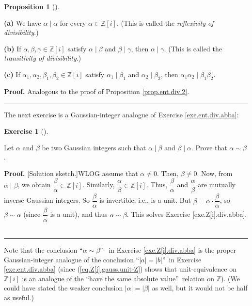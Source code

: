 \documentclass[numbers=enddot,12pt,final,onecolumn,notitlepage]{scrartcl}%
\newcounter{exer}
\numberwithin{exer}{subsection}
\theoremstyle{definition}
\newtheorem{prop}[theo]{Proposition}
\newenvironment{proposition}[1][]
{\begin{prop}[#1]\begin{leftbar}}
{\end{leftbar}\end{prop}}
\newtheorem{exmp}[exer]{Exercise}
\newenvironment{exercise}[1][]
{\begin{exmp}[#1]\begin{leftbar}}
{\end{leftbar}\end{exmp}}
\newenvironment{proof}[1][Proof]{\noindent\textbf{#1.} }{\ \rule{0.5em}{0.5em}}
\begin{document}
\begin{proposition}
\label{prop.Z[i].div.2}\textbf{(a)} We have $\alpha\mid\alpha$ for every
$\alpha\in\mathbb{Z}\left[  i\right]  $. (This is called the
\textit{reflexivity of divisibility}.)

\textbf{(b)} If $\alpha,\beta,\gamma\in\mathbb{Z}\left[  i\right]  $ satisfy
$\alpha\mid\beta$ and $\beta\mid\gamma$, then $\alpha\mid\gamma$. (This is
called the \textit{transitivity of divisibility}.)

\textbf{(c)} If $\alpha_{1},\alpha_{2},\beta_{1},\beta_{2}\in\mathbb{Z}\left[
i\right]  $ satisfy $\alpha_{1}\mid\beta_{1}$ and $\alpha_{2}\mid\beta_{2}$,
then $\alpha_{1}\alpha_{2}\mid\beta_{1}\beta_{2}$.
\end{proposition}

\begin{proof}
Analogous to the proof of Proposition \ref{prop.ent.div.2}.
\end{proof}

The next exercise is a Gaussian-integer analogue of Exercise
\ref{exe.ent.div.abba}:

\begin{exercise}
\label{exe.Z[i].div.abba}Let $\alpha$ and $\beta$ be two Gaussian integers
such that $\alpha\mid\beta$ and $\beta\mid\alpha$. Prove that $\alpha\sim
\beta$.
\end{exercise}

\begin{proof}
[Solution sketch.]WLOG assume that $\alpha\neq0$. Then, $\beta\neq0$. Now,
from $\alpha\mid\beta$, we obtain $\dfrac{\beta}{\alpha}\in\mathbb{Z}\left[
i\right]  $. Similarly, $\dfrac{\alpha}{\beta}\in\mathbb{Z}\left[  i\right]
$. Thus, $\dfrac{\beta}{\alpha}$ and $\dfrac{\alpha}{\beta}$ are mutually
inverse Gaussian integers. So $\dfrac{\beta}{\alpha}$ is invertible, i.e., is
a unit. But $\beta=\alpha\cdot\dfrac{\beta}{\alpha}$, so $\beta\sim\alpha$
(since $\dfrac{\beta}{\alpha}$ is a unit), and thus $\alpha\sim\beta$. This
solves Exercise \ref{exe.Z[i].div.abba}.
\end{proof}

Note that the conclusion \textquotedblleft$\alpha\sim\beta$\textquotedblright%
\ in Exercise \ref{exe.Z[i].div.abba} is the proper Gaussian-integer analogue
of the conclusion \textquotedblleft$\left\vert a\right\vert =\left\vert
b\right\vert $\textquotedblright\ in Exercise \ref{exe.ent.div.abba} (since
(\ref{eq.Z[i].gauss.unit-Z}) shows that unit-equivalence on $\mathbb{Z}\left[
i\right]  $ is an analogue of the \textquotedblleft have the same absolute
value\textquotedblright\ relation on $\mathbb{Z}$). (We could have stated the
weaker conclusion $\left\vert \alpha\right\vert =\left\vert \beta\right\vert $
as well, but it would not be half as useful.)
\end{document}
